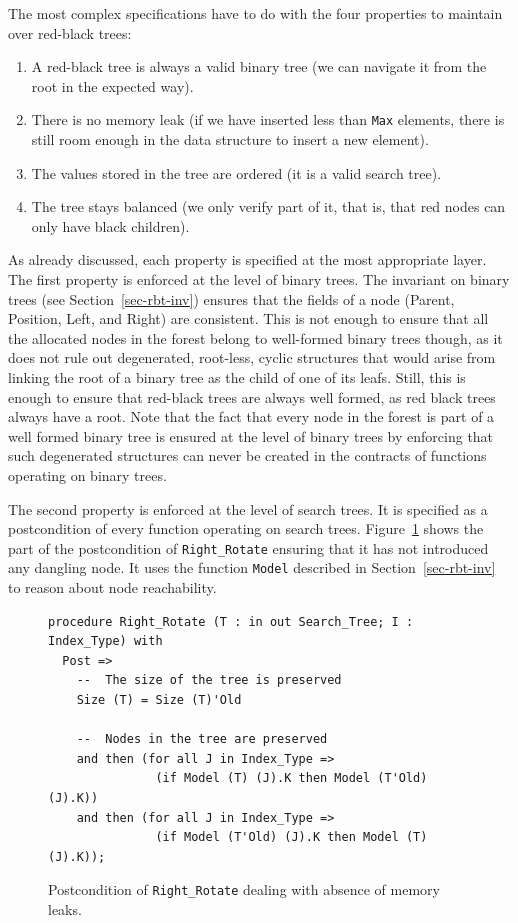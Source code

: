 \documentclass{llncs}
\begin{document}
The most complex specifications have to do with the four properties to maintain
over red-black trees:
\begin{enumerate}
 \item A red-black tree is always a valid binary tree (we can navigate it from
   the root in the expected way).
 \item There is no memory leak (if we have inserted less than \texttt{Max}
   elements, there is still room enough in the data structure to insert a new
   element).
 \item The values stored in the tree are ordered (it is a valid search tree).
 \item The tree stays balanced (we only verify part of it, that is, that red
   nodes can only have black children).
\end{enumerate}

As already discussed, each property is specified at the most appropriate layer.
The first property is enforced at the level of binary trees. The invariant on
binary trees (see Section~\ref{sec-rbt-inv}) ensures that the fields of a node
(Parent, Position, Left, and Right) are consistent. This is not enough to
ensure that all the allocated nodes in the forest belong to well-formed binary
trees though, as it does not rule out degenerated, root-less, cyclic structures
that would arise from linking the root of a binary tree as the child of one of
its leafs. Still, this is enough to ensure that red-black trees are always well
formed, as red black trees always have a root. Note that the fact that every
node in the forest is part of a well formed binary tree is ensured at the level
of binary trees by enforcing that such degenerated structures can never be
created in the contracts of functions operating on binary trees.

The second property is enforced at the level of search trees. It is specified
as a postcondition of every function operating on search trees.
Figure~\ref{fig-spec-no-leak} shows the part of the postcondition of
\texttt{Right\_Rotate} ensuring that it has not introduced any dangling
node. It uses the function \texttt{Model} described in
Section~\ref{sec-rbt-inv} to reason about node reachability.

\begin{figure}[ht]
\begin{small}
\begin{lstlisting}
procedure Right_Rotate (T : in out Search_Tree; I : Index_Type) with
  Post =>
    --  The size of the tree is preserved
    Size (T) = Size (T)'Old

    --  Nodes in the tree are preserved
    and then (for all J in Index_Type =>
               (if Model (T) (J).K then Model (T'Old) (J).K))
    and then (for all J in Index_Type =>
               (if Model (T'Old) (J).K then Model (T) (J).K));
\end{lstlisting}
\end{small}
\caption{\label{fig-spec-no-leak} Postcondition of \texttt{Right\_Rotate} dealing with absence of memory leaks.}
\end{figure}
\end{document}
